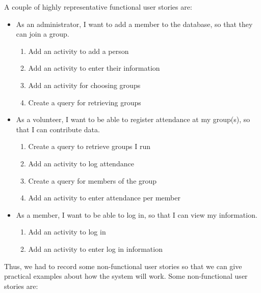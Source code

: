 \documentclass{l3proj}
\begin{document}
A couple of highly representative functional user stories are:
\begin{itemize}

\item As an administrator, I want to add a member to the database, so that they can join a group.

	\begin{enumerate}
  	\item Add an activity to add a person
  	
	\item Add an activity to enter their information

	\item Add an activity for choosing groups

	\item Create a query for retrieving groups
	\end{enumerate}
\item As a volunteer, I want to be able to register attendance at my group(s), so that I can contribute data.

	\begin{enumerate}
	\item Create a query to retrieve groups I run
	
	\item Add an activity to log attendance
	
	\item Create a query for members of the group
	
	\item Add an activity to enter attendance per member
	
	\end{enumerate}

\item As a member, I want to be able to log in, so that I can view my information.

	\begin{enumerate}
	
	\item Add an activity to log in
	\item Add an activity to enter log in information
	
	\end{enumerate}

\end{itemize}

Thus, we had to record some non-functional user stories so that we can give practical examples about how the system will work. Some non-functional user stories are:
\end{document}
